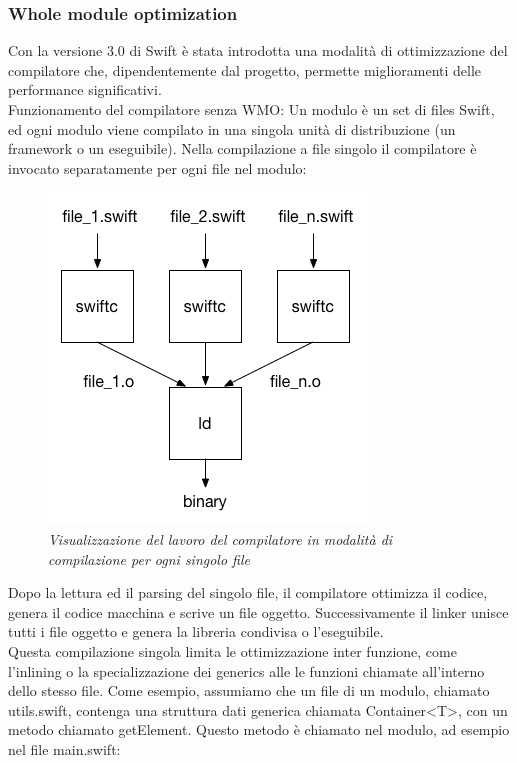 \subsubsection{Whole module optimization}
Con la versione 3.0 di Swift è stata introdotta una modalità di ottimizzazione del compilatore che, dipendentemente dal progetto, permette miglioramenti delle performance significativi.\\
Funzionamento del compilatore senza WMO:
Un modulo è un set di files Swift, ed ogni modulo viene compilato in una singola unità di distribuzione (un framework o un eseguibile). Nella compilazione a file singolo il compilatore è invocato separatamente per ogni file nel modulo: 
\begin{figure}[H]
      \centering
      \includegraphics[scale=0.80]{immagini/single-file.png}
            \vspace{0.8cm}
            \caption{\textit{Visualizzazione del lavoro del compilatore in modalità di compilazione per ogni singolo file}}
    \end{figure}
Dopo la lettura ed il parsing del singolo file, il compilatore ottimizza il codice, genera il codice macchina e scrive un file oggetto. Successivamente il linker unisce tutti i file oggetto e genera la libreria condivisa o l'eseguibile.\\
Questa compilazione singola limita le ottimizzazione inter funzione, come l'inlining o la specializzazione dei generics alle le funzioni chiamate all'interno dello stesso file. Come esempio, assumiamo che un file di un modulo, chiamato utils.swift, contenga una struttura dati generica chiamata Container<T>, con un metodo chiamato getElement. Questo metodo è chiamato nel modulo, ad esempio nel file main.swift:
